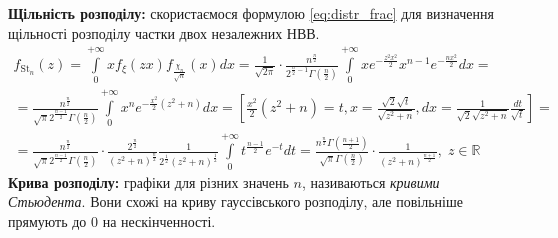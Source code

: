 \noindent\textbf{Щільність розподілу:} скористаємося формулою \eqref{eq:distr_frac} для визначення щільності розподілу частки
двох незалежних НВВ.
\begin{gather*}
    f_{\mathrm{St}_n} (z) = \int\limits_0^{+\infty} x f_{\xi}(z x) f_{\frac{\chi_n}{\sqrt{n}}} (x) dx =
    \frac{1}{\sqrt{2\pi}} \cdot \frac{n^{\frac{n}{2}}}{2^{\frac{n}{2} - 1} \Gamma\left(\frac{n}{2}\right)}
    \int\limits_0^{+\infty} x e^{-\frac{z^2 x^2}{2}} x^{n-1} e^{-\frac{nx^2}{2}} dx = \\
    = \frac{n^{\frac{n}{2}}}{\sqrt{\pi} 2^{\frac{n-1}{2}} \Gamma\left(\frac{n}{2}\right)}
    \int\limits_0^{+\infty} x^n e^{-\frac{x^2}{2}(z^2+n)} dx = 
    \left[ \frac{x^2}{2} (z^2 + n) = t, x = \frac{\sqrt{2} \sqrt{t}}{\sqrt{z^2 + n}},
    dx = \frac{1}{\sqrt{2}\sqrt{z^2 + n}} \frac{dt}{\sqrt{t}}\right] = \\
    = \frac{n^{\frac{n}{2}}}{\sqrt{\pi} 2^{\frac{n-1}{2}} \Gamma\left(\frac{n}{2}\right)} \cdot
    \frac{2^{\frac{n}{2}}}{(z^2 + n)^{\frac{n}{2}}} \frac{1}{2^{\frac{1}{2}}(z^2 + n)^{\frac{1}{2}}}
    \int\limits_0^{+\infty} t^{\frac{n-1}{2}} e^{-t} dt = 
    \frac{n^{\frac{n}{2}} \Gamma\left(\frac{n+1}{2}\right)}{\sqrt{\pi} \Gamma\left(\frac{n}{2}\right)} \cdot
    \frac{1}{(z^2 + n)^{\frac{n+1}{2}}}, \; z \in \mathbb{R}
\end{gather*}
\noindent \textbf{Крива розподілу:} графіки для різних значень $n$, називаються \emph{кривими Стьюдента}.
Вони схожі на криву гауссівського розподілу, але повільніше прямують до 0 на нескінченності.
\begin{center}
\end{center}

